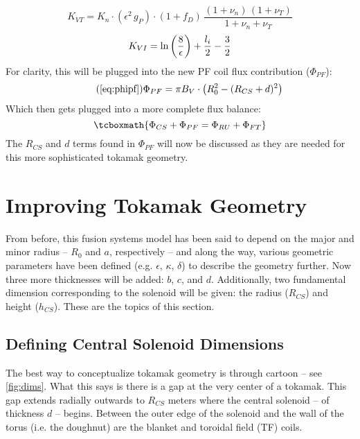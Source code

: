 \begin{equation}
	K_{VT} = K_{n} \cdot ( \epsilon ^ 2 \, g_P ) \cdot ( 1 + f_D ) \, \frac{ (1 + \nu_n) \, (1 + \nu_T) }{1 + \nu_n + \nu_T }
\end{equation}
\begin{equation}
	K_{VI} = \textnormal{ln} \left(\frac{8}{\epsilon}\right) + \frac{l_i}{2} - \frac{3}{2}
\end{equation}
For clarity, this will be plugged into the new PF coil flux contribution ($\Phi_{PF}$):
\begin{equation}
	\tag{\ref{eq:phipf}}
	\Phi_{PF} = \pi B_V \cdot \left( R_0^2 - ( R_{CS} + d ) ^ 2 \right)
\end{equation}
Which then gets plugged into a more complete flux balance:
\begin{equation}
	\label{eq:full_ibal}
	\tcboxmath{
		\Phi_{CS} + \Phi_{PF} = \Phi_{RU} + \Phi_{FT}
	}
\end{equation}
The $R_{CS}$ and $d$ terms found in $\Phi_{PF}$ will now be discussed as they are needed for this more sophisticated tokamak geometry.

\section{Improving Tokamak Geometry}

From before, this fusion systems model has been said to depend on the major and minor radius -- $R_0$ and $a$, respectively -- and along the way, various geometric parameters have been defined (e.g. $\epsilon$, $\kappa$, $\delta$) to describe the geometry further. Now three more thicknesses will be added: $b$, $c$, and $d$. Additionally, two fundamental dimension corresponding to the solenoid will be given: the radius ($R_{CS}$) and height ($h_{CS}$). These are the topics of this section.

\subsection{Defining Central Solenoid Dimensions}

The best way to conceptualize tokamak geometry is through cartoon -- see \cref{fig:dims}. What this says is there is a gap at the very center of a tokamak. This gap extends radially outwards to $R_{CS}$ meters where the  central solenoid -- of thickness $d$ -- begins. Between the outer edge of the solenoid and the wall of the torus (i.e. the doughnut) are the blanket and toroidal field (TF) coils.

